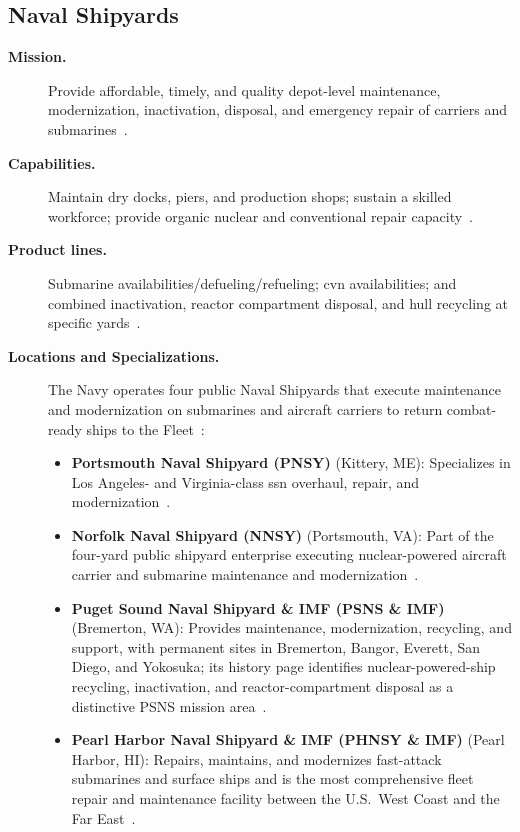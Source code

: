 \documentclass[../main.tex]{subfiles}
\begin{document}
\subsection{Naval Shipyards}
\begin{description}
  \item[\textbf{Mission.}] Provide affordable, timely, and quality depot-level maintenance, modernization, inactivation, disposal, and emergency repair of carriers and submarines~\autocite{edo-4-1-1-fleet-maint-assets-2025}.
  \item[\textbf{Capabilities.}] Maintain dry docks, piers, and production shops; sustain a skilled workforce; provide organic nuclear and conventional repair capacity~\autocite{edo-4-1-1-fleet-maint-assets-2025}.
  \item[\textbf{Product lines.}] Submarine availabilities/defueling/refueling; \ac{cvn} availabilities; and combined inactivation, reactor compartment disposal, and hull recycling at specific yards~\autocite{edo-4-1-1-fleet-maint-assets-2025}.
  \item[\textbf{Locations and Specializations.}] The Navy operates four public Naval Shipyards that execute maintenance and modernization on submarines and aircraft carriers to return combat-ready ships to the Fleet~\autocite{NAVSEA-Shipyards-SIOP-2026}:
    \begin{itemize}
      \item \textbf{Portsmouth Naval Shipyard (PNSY)} (Kittery, ME): Specializes in Los Angeles- and Virginia-class \acs{ssn} overhaul, repair, and modernization~\autocite{navsea-pnsy-about-2026}.
      \item \textbf{Norfolk Naval Shipyard (NNSY)} (Portsmouth, VA): Part of the four-yard public shipyard enterprise executing nuclear-powered aircraft carrier and submarine maintenance and modernization~\autocite{NAVSEA-Shipyards-SIOP-2026}.
      \item \textbf{Puget Sound Naval Shipyard \& IMF (PSNS \& IMF)} (Bremerton, WA): Provides maintenance, modernization, recycling, and support, with permanent sites in Bremerton, Bangor, Everett, San Diego, and Yokosuka; its history page identifies nuclear-powered-ship recycling, inactivation, and reactor-compartment disposal as a distinctive PSNS mission area~\autocite{NAVSEA-PSNS-IMF-Home-2026,NAVSEA-PSNS-IMF-History-2026}.
      \item \textbf{Pearl Harbor Naval Shipyard \& IMF (PHNSY \& IMF)} (Pearl Harbor, HI): Repairs, maintains, and modernizes fast-attack submarines and surface ships and is the most comprehensive fleet repair and maintenance facility between the U.S.\ West Coast and the Far East~\autocite{NAVSEA-PHNSY-IMF-Home-2026}.
    \end{itemize}
\end{description}
\end{document}
